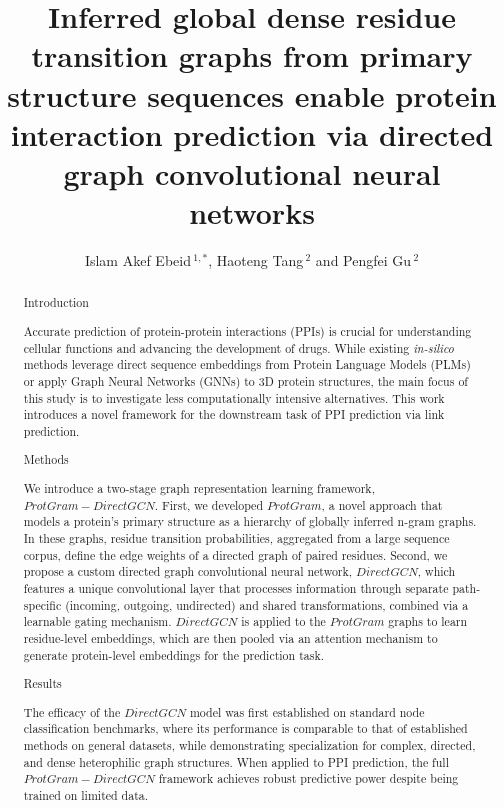 \documentclass[utf8]{FrontiersinHarvard}
\def\firstAuthorLast{Ebeid {et~al.}}
\def\Authors{Islam Akef Ebeid\,$^{1,*}$, Haoteng Tang\,$^{2}$ and Pengfei Gu\,$^{2}$}
\begin{document}
	\onecolumn
	\title[ProtGram-DirectGCN]{Inferred global dense residue transition graphs from primary structure sequences enable protein interaction prediction via directed graph convolutional neural networks} 
	\author[\firstAuthorLast ]{\Authors}
	\address{}
	\correspondance{}
	\extraAuth{}
	\maketitle
	\begin{abstract}
Introduction

Accurate prediction of protein-protein interactions (PPIs) is crucial for understanding cellular functions and advancing the development of drugs. While existing \textit{in-silico} methods leverage direct sequence embeddings from Protein Language Models (PLMs) or apply Graph Neural Networks (GNNs) to 3D protein structures, the main focus of this study is to investigate less computationally intensive alternatives. This work introduces a novel framework for the downstream task of PPI prediction via link prediction.

Methods

We introduce a two-stage graph representation learning framework, $ProtGram-DirectGCN$. First, we developed $ProtGram$, a novel approach that models a protein's primary structure as a hierarchy of globally inferred n-gram graphs. In these graphs, residue transition probabilities, aggregated from a large sequence corpus, define the edge weights of a directed graph of paired residues. Second, we propose a custom directed graph convolutional neural network, $DirectGCN$, which features a unique convolutional layer that processes information through separate path-specific (incoming, outgoing, undirected) and shared transformations, combined via a learnable gating mechanism. $DirectGCN$ is applied to the $ProtGram$ graphs to learn residue-level embeddings, which are then pooled via an attention mechanism to generate protein-level embeddings for the prediction task.

Results

The efficacy of the $DirectGCN$ model was first established on standard node classification benchmarks, where its performance is comparable to that of established methods on general datasets, while demonstrating specialization for complex, directed, and dense heterophilic graph structures. When applied to PPI prediction, the full $ProtGram-DirectGCN$ framework achieves robust predictive power despite being trained on limited data.


\end{abstract}
\end{document}
